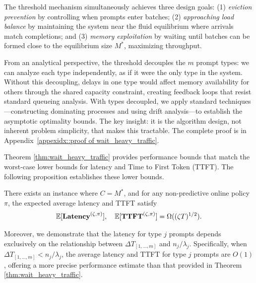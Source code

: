 The threshold mechanism simultaneously achieves three design goals: (1) \emph{eviction prevention} by controlling when prompts enter batches; (2) \emph{approaching load balance} by maintaining the system near the fluid equilibrium where arrivals match completions; and (3) \emph{memory exploitation} by waiting until batches can be formed close to the equilibrium size $M^*$, maximizing throughput.

From an analytical perspective, the threshold decouples the $m$ prompt types: we can analyze each type independently, as if it were the only type in the system. Without this decoupling, delays in one type would affect memory availability for others through the shared capacity constraint, creating feedback loops that resist standard queueing analysis. With types decoupled, we apply standard techniques---constructing dominating processes and using drift analysis---to establish the asymptotic optimality bounds. The key insight: it is the algorithm design, not inherent problem simplicity, that makes this tractable. The complete proof is in Appendix~\ref{appexidx::proof of wait_heavy_traffic}.

Theorem \ref{thm:wait_heavy_traffic} provides performance bounds that match the worst-case lower bounds for latency and Time to First Token (TTFT). The following proposition establishes these lower bounds.
\begin{proposition}\label{prop::simple random walk, tight bound}
There exists an instance where \( C = M^* \), and for any non-predictive online policy \(\pi\), the expected average latency and TTFT satisfy
\[
\mathbb{E}[\textbf{Latency}^{(\zeta,\pi)}],\quad \mathbb{E}[\textbf{TTFT}^{(\zeta,\pi)}] = \Omega((\zeta T)^{1/2}).
\]
\end{proposition}
Moreover, we demonstrate that the latency for type \( j \) prompts depends exclusively on the relationship between \(\Delta T_{[1,\dots,m]}\) and $n_j/\lambda_j$. Specifically, when \(\Delta T_{[1,\dots,m]} < n_j/\lambda_j\), the average latency and TTFT for type \( j \) prompts are \( O(1) \), offering a more precise performance estimate than that provided in Theorem \ref{thm:wait_heavy_traffic}.


